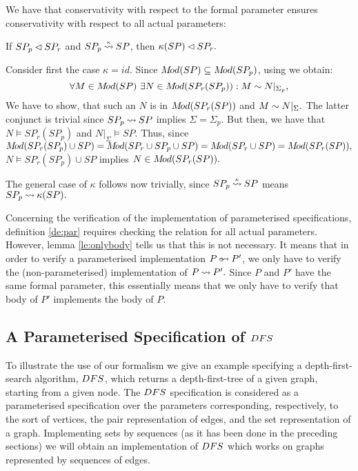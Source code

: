 We have that conservativity with respect to the formal parameter ensures conservativity with respect to all actual parameters: \begin{LEMMA}\label{le:conservative}
If $SP_p\lhd SP_r$ and $SP_p\mathbin{\stackrel{\scriptscriptstyle \kappa}{\mathbin{\leadsto}}} SP$, then $\kappa(SP)\lhd SP_r.$
\end{LEMMA}
\begin{PROOF}
Consider first the case $\kappa=id.$
Since $M\!od(SP)\subseteq M\!od(SP_p)$, using  we obtain:
\[\forall M\in \Mod(SP)\ \exists N\in \Mod(SP_r(SP_p)): M\eleq N|_{\Sigma_{p}},\]
We have to show, that such an $N$ is in $M\!od(SP_r(SP))$ and $M\sim N|_\Sigma.$
The latter conjunct is trivial since $SP_p\mathbin{\leadsto} SP$ implies $\Sigma=\Sigma_p.$ But then, we have that $N\models SP_r(SP_p)$ and $N|_\Sigma\models SP$. Thus, since $M\!od(SP_r(SP_p)\cup SP)=M\!od(SP_r\cup SP_p\cup SP)=M\!od(SP_r\cup SP)= M\!od(SP_r(SP)),$
$N\models SP_r(SP_p)\cup SP$ implies $N\in M\!od(SP_r(SP)).$ 

The general case of $\kappa$ follows now trivially, since $SP_p\mathbin{\stackrel{\scriptscriptstyle \kappa}{\mathbin{\leadsto}}} SP$ means $SP_p\mathbin{\leadsto} \kappa(SP).$
\end{PROOF}
Concerning the verification of the implementation of parameterised specifications,
definition \ref{de:par} requires checking the relation for all actual parameters. However, lemma \ref{le:onlybody} tells us that this is not 
necessary.
It means that in order to verify a parameterised implementation $P\pim P'$, we
only have to verify the (non-parameterised) implementation of $P\mathbin{\leadsto} P'.$ Since $P$ and $P'$ have the same formal parameter, this essentially means that we only have to verify that body of $P'$ implements the body of $P$.

\subsection{A Parameterised Specification of $DFS$} To illustrate the use of
our formalism we give an example specifying a depth-first-search algorithm, $DFS$,
which returns a depth-first-tree of a given graph, starting from a given node.
 The $DFS$ specification is considered as a
parameterised specification over the parameters corresponding, respectively,
to the sort of vertices, the pair representation of edges, and the set
representation of a graph. Implementing sets by sequences (as it has been
done in the preceding sections) we will obtain an implementation of $DFS$
which works on graphs represented by sequences of edges. 

